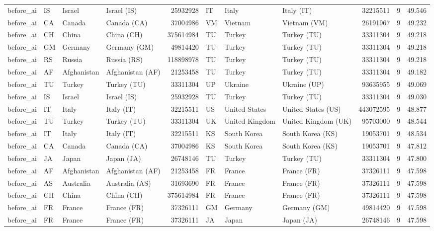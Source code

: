 \begin{tabular}{llllrlllrrr}
before\_ai & IS & Israel & Israel (IS) & 25932928 & IT & Italy & Italy (IT) & 32215511 & 9 & 49.546 \\
before\_ai & CA & Canada & Canada (CA) & 37004986 & VM & Vietnam & Vietnam (VM) & 26191967 & 9 & 49.232 \\
before\_ai & CH & China & China (CH) & 375614984 & TU & Turkey & Turkey (TU) & 33311304 & 9 & 49.218 \\
before\_ai & GM & Germany & Germany (GM) & 49814420 & TU & Turkey & Turkey (TU) & 33311304 & 9 & 49.218 \\
before\_ai & RS & Russia & Russia (RS) & 118898978 & TU & Turkey & Turkey (TU) & 33311304 & 9 & 49.218 \\
before\_ai & AF & Afghanistan & Afghanistan (AF) & 21253458 & TU & Turkey & Turkey (TU) & 33311304 & 9 & 49.182 \\
before\_ai & TU & Turkey & Turkey (TU) & 33311304 & UP & Ukraine & Ukraine (UP) & 93635955 & 9 & 49.069 \\
before\_ai & IS & Israel & Israel (IS) & 25932928 & TU & Turkey & Turkey (TU) & 33311304 & 9 & 49.030 \\
before\_ai & IT & Italy & Italy (IT) & 32215511 & US & United States & United States (US) & 443072595 & 9 & 48.877 \\
before\_ai & TU & Turkey & Turkey (TU) & 33311304 & UK & United Kingdom & United Kingdom (UK) & 95703000 & 9 & 48.544 \\
before\_ai & IT & Italy & Italy (IT) & 32215511 & KS & South Korea & South Korea (KS) & 19053701 & 9 & 48.534 \\
before\_ai & CA & Canada & Canada (CA) & 37004986 & KS & South Korea & South Korea (KS) & 19053701 & 9 & 47.812 \\
before\_ai & JA & Japan & Japan (JA) & 26748146 & TU & Turkey & Turkey (TU) & 33311304 & 9 & 47.800 \\
before\_ai & AF & Afghanistan & Afghanistan (AF) & 21253458 & FR & France & France (FR) & 37326111 & 9 & 47.598 \\
before\_ai & AS & Australia & Australia (AS) & 31693690 & FR & France & France (FR) & 37326111 & 9 & 47.598 \\
before\_ai & CH & China & China (CH) & 375614984 & FR & France & France (FR) & 37326111 & 9 & 47.598 \\
before\_ai & FR & France & France (FR) & 37326111 & GM & Germany & Germany (GM) & 49814420 & 9 & 47.598 \\
before\_ai & FR & France & France (FR) & 37326111 & JA & Japan & Japan (JA) & 26748146 & 9 & 47.598 \\

\end{tabular}
